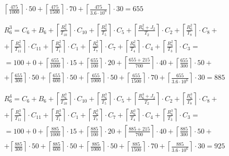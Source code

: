 \begin{gather*}
\begin{multlined}
    \left\lceil\frac{475}{1000}\right\rceil\cdot 50 +%
    \left\lceil\frac{475}{1500}\right\rceil\cdot 70 +%
    \left\lceil\frac{475}{3.6 \cdot 10^6}\right\rceil\cdot 30 = 655 \\
  \end{multlined} \\
  \begin{multlined}
    R_6^3 = C_6 + B_6 + \left\lceil\frac{R_6^2}{T_{10}}\right\rceil\cdot C_{10} + %
    \left\lceil\frac{R_6^2}{T_5}\right\rceil\cdot C_5 + %
    \left\lceil\frac{R_6^2 + J_2}{T_2}\right\rceil\cdot C_2 + %
    \left\lceil\frac{R_6^2}{T_8}\right\rceil\cdot C_8 + \\%
    + \left\lceil\frac{R_6^2}{T_{11}}\right\rceil\cdot C_{11} + %
    \left\lceil\frac{R_6^2}{T_1}\right\rceil\cdot C_1 +%
    \left\lceil\frac{R_6^2}{T_7}\right\rceil\cdot C_7 +%
    \left\lceil\frac{R_6^2}{T_4}\right\rceil\cdot C_4 +%
    \left\lceil\frac{R_6^2}{T_3}\right\rceil\cdot C_3 = \\%
    = 100 + 0 + \left\lceil\frac{655}{1000}\right\rceil\cdot 15 + %
    \left\lceil\frac{655}{100}\right\rceil\cdot 20 + %
    \left\lceil\frac{655 + 215}{700}\right\rceil\cdot 40 + %
    \left\lceil\frac{655}{300}\right\rceil\cdot 50 + \\%
    + \left\lceil\frac{655}{300}\right\rceil\cdot 50 + %
    \left\lceil\frac{655}{600}\right\rceil\cdot 50 + %
    \left\lceil\frac{655}{1000}\right\rceil\cdot 50 +%
    \left\lceil\frac{655}{1500}\right\rceil\cdot 70 +%
    \left\lceil\frac{655}{3.6 \cdot 10^6}\right\rceil\cdot 30 = 885 \\
  \end{multlined} \\
  \begin{multlined}
    R_6^4 = C_6 + B_6 + \left\lceil\frac{R_6^3}{T_{10}}\right\rceil\cdot C_{10} + %
    \left\lceil\frac{R_6^3}{T_5}\right\rceil\cdot C_5 + %
    \left\lceil\frac{R_6^3 + J_2}{T_2}\right\rceil\cdot C_2 + %
    \left\lceil\frac{R_6^3}{T_8}\right\rceil\cdot C_8 + \\%
    + \left\lceil\frac{R_6^3}{T_{11}}\right\rceil\cdot C_{11} + %
    \left\lceil\frac{R_6^3}{T_1}\right\rceil\cdot C_1 +%
    \left\lceil\frac{R_6^3}{T_7}\right\rceil\cdot C_7 +%
    \left\lceil\frac{R_6^3}{T_4}\right\rceil\cdot C_4 +%
    \left\lceil\frac{R_6^3}{T_3}\right\rceil\cdot C_3 = \\%
    = 100 + 0 + \left\lceil\frac{885}{1000}\right\rceil\cdot 15 + %
    \left\lceil\frac{885}{100}\right\rceil\cdot 20 + %
    \left\lceil\frac{885 + 215}{700}\right\rceil\cdot 40 + %
    \left\lceil\frac{885}{300}\right\rceil\cdot 50 + \\%
    + \left\lceil\frac{885}{300}\right\rceil\cdot 50 + %
    \left\lceil\frac{885}{600}\right\rceil\cdot 50 + %
    \left\lceil\frac{885}{1000}\right\rceil\cdot 50 +%
    \left\lceil\frac{885}{1500}\right\rceil\cdot 70 +%
    \left\lceil\frac{885}{3.6 \cdot 10^6}\right\rceil\cdot 30 = 925 \\
  \end{multlined} \\
\end{gather*}

